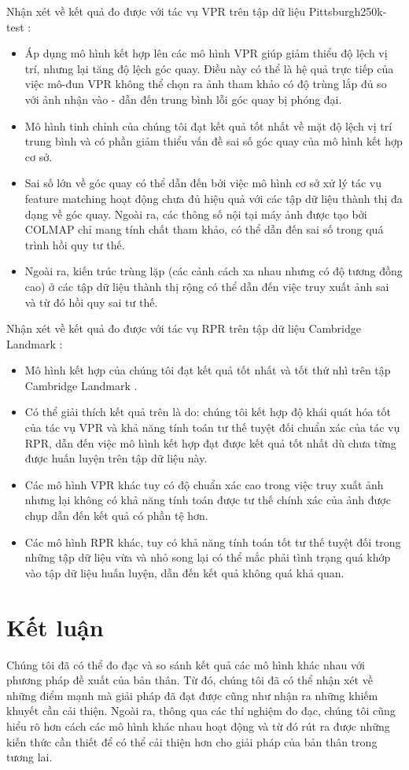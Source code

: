 Nhận xét về kết quả đo được với tác vụ VPR trên tập dữ liệu Pittsburgh250k-test \cite{6618963}:
\begin{itemize}
	\item Áp dụng mô hình kết hợp lên các mô hình VPR giúp giảm thiểu độ lệch vị trí, nhưng lại tăng độ lệch góc quay. Điều này có thể là hệ quả trực tiếp của việc mô-đun VPR không thể chọn ra ảnh tham khảo có độ trùng lắp đủ so với ảnh nhận vào - dẫn đến trung bình lỗi góc quay bị phóng đại.
	\item Mô hình tinh chỉnh của chúng tôi đạt kết quả tốt nhất về mặt độ lệch vị trí trung bình và có phần giảm thiểu vấn đề sai số góc quay của mô hình kết hợp cơ sở. 
	\item Sai số lớn về góc quay có thể dẫn đến bởi việc mô hình cơ sở xử lý tác vụ feature matching hoạt động chưa đủ hiệu quả với các tập dữ liệu thành thị đa dạng về góc quay. Ngoài ra, các thông số nội tại máy ảnh được tạo bởi COLMAP chỉ mang tính chất tham khảo, có thể dẫn đến sai số trong quá trình hồi quy tư thế.
	\item Ngoài ra, kiến trúc trùng lặp (các cảnh cách xa nhau nhưng có độ tương đồng cao) ở các tập dữ liệu thành thị rộng có thể dẫn đến việc truy xuất ảnh sai và từ đó hồi quy sai tư thế.
\end{itemize}


Nhận xét về kết quả đo được với tác vụ RPR trên tập dữ liệu Cambridge Landmark \cite{kendall2016posenet}:
\begin{itemize}
	\item Mô hình kết hợp của chúng tôi đạt kết quả tốt nhất và tốt thứ nhì trên tập Cambridge Landmark \cite{kendall2016posenet}.
	\item Có thể giải thích kết quả trên là do: chúng tôi kết hợp độ khái quát hóa tốt của tác vụ VPR và khả năng tính toán tư thế tuyệt đối chuẩn xác của tác vụ RPR, dẫn đến việc mô hình kết hợp đạt được kết quả tốt nhất dù chưa từng được huấn luyện trên tập dữ liệu này. 
	\item Các mô hình VPR khác tuy có độ chuẩn xác cao trong việc truy xuất ảnh nhưng lại không có khả năng tính toán được tư thế chính xác của ảnh được chụp dẫn đến kết quả có phần tệ hơn.
	\item Các mô hình RPR khác, tuy có khả năng tính toán tốt tư thế tuyệt đối trong những tập dữ liệu vừa và nhỏ song lại có thể mắc phải tình trạng quá khớp vào tập dữ liệu huấn luyện, dẫn đến kết quả không quá khả quan.
\end{itemize}


\section{Kết luận}
Chúng tôi đã có thể đo đạc và so sánh kết quả các mô hình khác nhau với phương pháp đề xuất của bản thân. Từ đó, chúng tôi đã có thể nhận xét về những điểm mạnh mà giải pháp đã đạt được cũng như nhận ra những khiếm khuyết cần cải thiện. Ngoài ra, thông qua các thí nghiệm đo đạc, chúng tôi cũng hiểu rõ hơn cách các mô hình khác nhau hoạt động và từ đó rút ra được những kiến thức cần thiết để có thể cải thiện hơn cho giải pháp của bản thân trong tương lai.